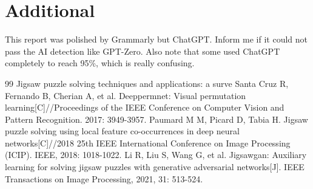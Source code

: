 \documentclass[conference]{IEEEtran}
\begin{document}
	\section*{Additional}
	This report was polished by Grammarly but ChatGPT. Inform me if it could not pass the AI detection like GPT-Zero. Also note that some used ChatGPT completely to reach 95\%, which is really confusing. 
	\begin{thebibliography}{99}
		 Jigsaw puzzle solving techniques and applications: a surve
		 Santa Cruz R, Fernando B, Cherian A, et al. Deeppermnet: Visual permutation learning[C]//Proceedings of the IEEE Conference on Computer Vision and Pattern Recognition. 2017: 3949-3957.
		 Paumard M M, Picard D, Tabia H. Jigsaw puzzle solving using local feature co-occurrences in deep neural networks[C]//2018 25th IEEE International Conference on Image Processing (ICIP). IEEE, 2018: 1018-1022.
		 Li R, Liu S, Wang G, et al. Jigsawgan: Auxiliary learning for solving jigsaw puzzles with generative adversarial networks[J]. IEEE Transactions on Image Processing, 2021, 31: 513-524.
	\end{thebibliography}
\end{document}
